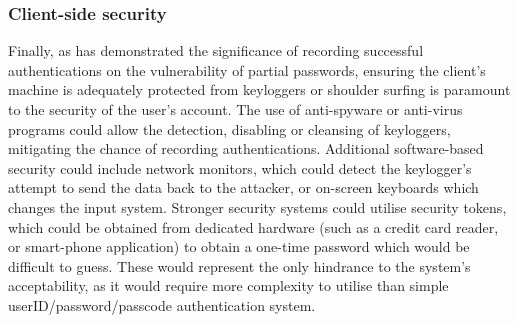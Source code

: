 \documentclass[british,11pt,a4paper]{article}
\begin{document}
\subsubsection{Client-side security}
Finally, as \citet{Aspinall2013-sh} has demonstrated the significance of recording successful authentications on the vulnerability of partial passwords, ensuring the client's machine is adequately protected from keyloggers or shoulder surfing is paramount to the security of the user's account. The use of anti-spyware or anti-virus programs could allow the detection, disabling or cleansing of keyloggers, mitigating the chance of recording authentications. Additional software-based security could include network monitors, which could detect the keylogger's attempt to send the data back to the attacker, or on-screen keyboards which changes the input system. Stronger security systems could utilise security tokens, which could be obtained from dedicated hardware (such as a credit card reader, or smart-phone application) to obtain a one-time password which would be difficult to guess. These would represent the only hindrance to the system's acceptability, as it would require more complexity to utilise than simple userID/password/passcode authentication system. 

\clearpage


\clearpage
\end{document}
